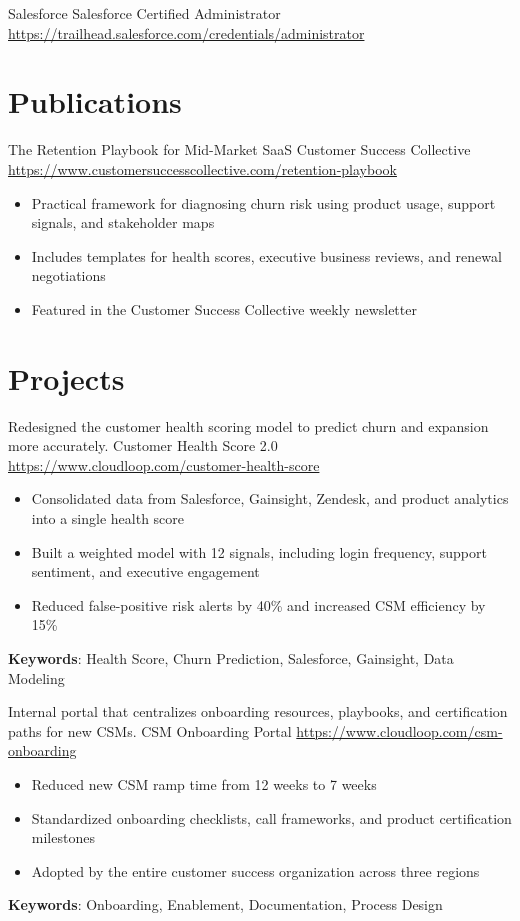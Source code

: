 \documentclass[a4paper, serif, 10pt]{moderncv}
\begin{document}
        {Salesforce}
        {Salesforce Certified Administrator}
        {\url{https://trailhead.salesforce.com/credentials/administrator}}
        {}
        {}
\section{Publications}

        {The Retention Playbook for Mid-Market SaaS}
        {Customer Success Collective}
        {\url{https://www.customersuccesscollective.com/retention-playbook}}
        {}
        {\begin{itemize}
\item Practical framework for diagnosing churn risk using product usage, support signals, and stakeholder maps
\item Includes templates for health scores, executive business reviews, and renewal negotiations
\item Featured in the Customer Success Collective weekly newsletter
\end{itemize}}
\section{Projects}

        {Redesigned the customer health scoring model to predict churn and expansion more accurately.}
        {Customer Health Score 2.0}
        {\url{https://www.cloudloop.com/customer-health-score}}
        {}
        {\begin{itemize}
\item Consolidated data from Salesforce, Gainsight, Zendesk, and product analytics into a single health score
\item Built a weighted model with 12 signals, including login frequency, support sentiment, and executive engagement
\item Reduced false-positive risk alerts by 40\% and increased CSM efficiency by 15\%
\end{itemize}
\textbf{Keywords}: Health Score, Churn Prediction, Salesforce, Gainsight, Data Modeling}

        {Internal portal that centralizes onboarding resources, playbooks, and certification paths for new CSMs.}
        {CSM Onboarding Portal}
        {\url{https://www.cloudloop.com/csm-onboarding}}
        {}
        {\begin{itemize}
\item Reduced new CSM ramp time from 12 weeks to 7 weeks
\item Standardized onboarding checklists, call frameworks, and product certification milestones
\item Adopted by the entire customer success organization across three regions
\end{itemize}
\textbf{Keywords}: Onboarding, Enablement, Documentation, Process Design}
\end{document}
